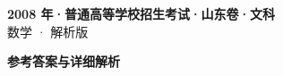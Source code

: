 \documentclass[zihao=-4, a4paper]{ctexart}
\begin{document}
\begin{center}
  {\Large\bfseries 2008 年·普通高等学校招生考试·山东卷·文科}\\[4pt]
  {\large 数学 · 解析版}
\end{center}
\medskip
{}

\clearpage
{}
\begin{center}{\Large\bfseries 参考答案与详细解析}\end{center}
\medskip

\end{document}

